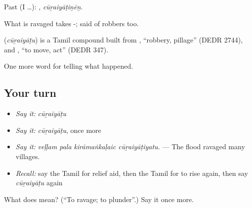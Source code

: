 Past (I …): , \emph{cūṟaiyāṭiṉēṉ}.

What is ravaged takes -; said of robbers too.

\begin{cousinweb}
\textbf{} (\emph{cūṟaiyāṭu}) is a Tamil compound built from , \textquotedblleft{}robbery, pillage\textquotedblright{} (DEDR 2744), and , \textquotedblleft{}to move, act\textquotedblright{} (DEDR 347).
\end{cousinweb}

\begin{grammarlens}[title={What you've built}]
One more word for telling what happened.
\end{grammarlens}

\subsection*{Your turn}
\begin{itemize}
\raggedright
  \item \emph{Say it:} \emph{cūṟaiyāṭu}
  \item \emph{Say it:} \emph{cūṟaiyāṭu}, once more
  \item \emph{Say it:} \emph{veḷḷam pala kirāmaṅkaḷaic cūṟaiyāṭiyatu.} — The flood ravaged many villages.
  \item \emph{Recall:} say the Tamil for relief aid, then the Tamil for to rise again, then say \emph{cūṟaiyāṭu} again
\end{itemize}

\begin{tcolorbox}[breakable,colback=teal!4,colframe=teal!35!black,title={Before you move on}]
What does  mean? (\textquotedblleft{}To ravage; to plunder\textquotedblright{}.) Say it once more.
\end{tcolorbox}
